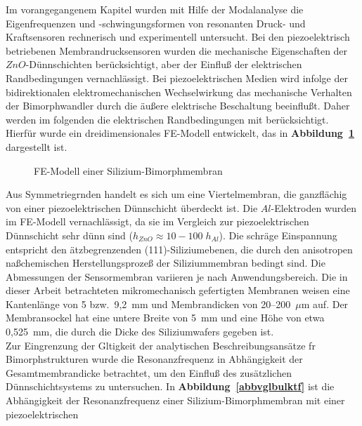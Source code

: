 Im vorangegangenem Kapitel wurden mit Hilfe der Modalanalyse die
Eigenfrequenzen und -schwingungsformen von resonanten Druck- und
Kraftsensoren rechnerisch und experimentell untersucht. Bei den
piezoelektrisch betriebenen Membrandrucksensoren wurden die mechanische
Eigenschaften der $ZnO$-Dünnschichten berücksichtigt, aber der
Einfluß der elektrischen Randbedingungen vernachlässigt. Bei
piezoelektrischen Medien wird infolge der bidirektionalen
elektromechanischen Wechselwirkung das mechanische Verhalten der
Bimorphwandler durch die äußere elektrische Beschaltung beeinflußt.
Daher werden im folgenden die elektrischen Randbedingungen mit
berücksichtigt.\\
Hierfür wurde ein dreidimensionales FE-Modell entwickelt, das
in {\bf Abbildung~\ref{abbbimorph}} dargestellt ist.
\begin{figure}[htb]

\begin{center}

\setabbfein
\end{center}
\caption{\label{abbbimorph}
 FE-Modell einer Silizium-Bimorphmembran}
\end{figure}
Aus Symmetriegrnden
handelt es sich um eine Viertelmembran, die ganzflächig von einer
piezoelektrischen Dünnschicht überdeckt ist. Die $Al$-Elektroden wurden
im FE-Modell vernachlässigt, da sie im Vergleich zur piezoelektrischen
Dünnschicht sehr dünn sind ($h_{ZnO} \approx 10-100 \; h_{Al}$). Die
schräge
Einspannung entspricht den ätzbegrenzenden (111)-Siliziumebenen, die durch
den anisotropen naßchemischen Herstellungsprozeß der Siliziummembran
bedingt sind. Die Abmessungen der
Sensormembran variieren je nach Anwendungsbereich. Die in dieser Arbeit
betrachteten mikromechanisch gefertigten Membranen weisen eine
Kantenlänge von 5 bzw.\ 9,2~mm und Membrandicken von 20--200~$\mu$m auf.
Der Membransockel hat eine untere Breite von 5~mm und eine Höhe von
etwa 0,525~mm, die durch die Dicke des Siliziumwafers
gegeben ist.\\
Zur Eingrenzung der Gltigkeit der analytischen Beschreibungsansätze
fr Bimorphstrukturen wurde die Resonanzfrequenz in Abhängigkeit der
Gesamtmembrandicke betrachtet, um den Einfluß des zusätzlichen
Dünnschichtsystems zu untersuchen.
In {\bf Abbildung~\ref{abbvglbulktf}} ist die Abhängigkeit der
Resonanzfrequenz einer Silizium-Bimorphmembran mit einer piezoelektrischen
